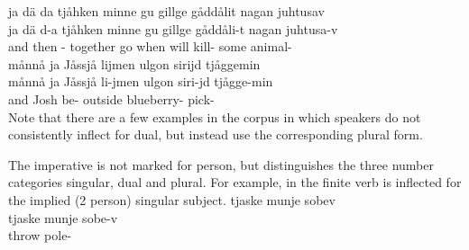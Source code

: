 \ea\label{inflectionalCatsVerbsEx1}%
\glll	ja dä da tjåhken minne gu gillge gåddålit nagan juhtusav\\
	ja dä d-a tjåhken minne gu gillge gåddåli-t nagan juhtusa-v\\
	and then -\BS{} together go\BS{} when will\BS{} kill- some animal-\\\nopagebreak
{}	
\z
\ea\label{inflectionalCatsVerbsEx2}%
\glll	månnå ja Jåssjå lijmen ulgon sirijd tjåggemin\\
	månnå ja Jåssjå li-jmen ulgon siri-jd tjågge-min\\
	 and Josh\BS{} be- outside blueberry- pick-\\\nopagebreak
{}	
\z
Note that there are a few examples in the corpus in which speakers do not consistently inflect for dual, but instead use the corresponding plural form. 

The imperative is not marked for person, but distinguishes the three number categories singular, dual and plural. 
For example, in  the finite verb  is inflected for the implied (2 person) singular subject. %
\ea\label{inflectionalCatsVerbsEx3}%
\glll	tjaske munje sobev\\
	tjaske munje sobe-v\\
	throw\BS{}  pole-\\\nopagebreak
{}	
\z


